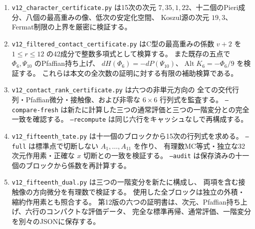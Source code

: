 \documentclass[a4paper,11pt]{ltjsarticle}
\theoremstyle{definition}
\begin{document}
\begin{enumerate}
 \item \texttt{v12\_character\_certificate.py} は15次の次元
 $7,35,1,22$、十二個のPieri成分、八個の最高重みの像、低次の安定化空間、
 Koszul源の次元 $19,3$、Fermat制限の上界を厳密に検証する。
 \item \texttt{v12\_filtered\_contact\_certificate.py} はC型の最高重みの係数
 $v+2$ を $1\le r\le12$ の42成分で整数多項式として検算する。
 また既存の五点で $\Phi_6,\Psi_{10}$ のPfaffian持ち上げ、
 $dH(\Phi_6)=-dP(\Psi_{10})$、$\operatorname{Alt}K_6=-\Phi_6/9$ を検証する。
 これらは本文の全次数の証明に対する有限の補助検算である。
 \item \texttt{v12\_contact\_rank\_certificate.py} は六つの非単元方向の
 全ての交代行列・Pfaffian微分・接触像、および非零な $6\times6$ 行列式を監査する。
 \texttt{--compare-fresh} は新たに計算した三つの通常評価と三つの一階変分との完全一致を確認する。
 \texttt{--recompute} は同じ六行をキャッシュなしで再構成する。
 \item \texttt{v12\_fifteenth\_tate.py} は十一個のブロックから15次の行列式を求める。
 \texttt{--full} は標準点で切断しない $A_1,\ldots,A_{11}$ を作り、
 有理数MC等式・独立な32次元作用素・正確な $x$ 切断との一致を検証する。
 \texttt{--audit} は保存済みの十一個のブロックから係数を再計算する。
 \item \texttt{v12\_fifteenth\_dual.py} は三つの一階変分を新たに構成し、
 両項を含む接触像の方向微分を有理数で検証する。
 使用した全ブロックは独立の外積・縮約作用素とも照合する。
 第12版の六つの証明書は、次元、Pfaffian持ち上げ、六行のコンパクトな評価データ、
 完全な標準再帰、通常評価、一階変分を別々のJSONに保存する。


\end{enumerate}
\end{document}
